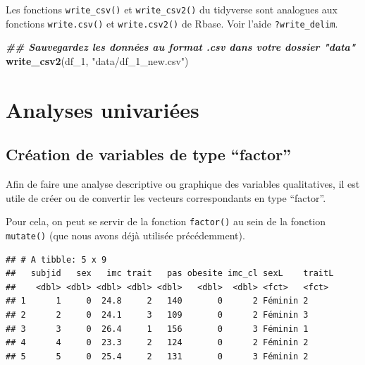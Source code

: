 \documentclass[
]{book}
\newenvironment{Shaded}{\begin{snugshade}}{\end{snugshade}}
\newcommand{\AttributeTok}[1]{\textcolor[rgb]{0.13,0.29,0.53}{#1}}
\newcommand{\CommentTok}[1]{\textcolor[rgb]{0.56,0.35,0.01}{\textit{#1}}}
\newcommand{\DecValTok}[1]{\textcolor[rgb]{0.00,0.00,0.81}{#1}}
\newcommand{\DocumentationTok}[1]{\textcolor[rgb]{0.56,0.35,0.01}{\textbf{\textit{#1}}}}
\newcommand{\FunctionTok}[1]{\textcolor[rgb]{0.13,0.29,0.53}{\textbf{#1}}}
\newcommand{\NormalTok}[1]{#1}
\newcommand{\OtherTok}[1]{\textcolor[rgb]{0.56,0.35,0.01}{#1}}
\newcommand{\SpecialCharTok}[1]{\textcolor[rgb]{0.81,0.36,0.00}{\textbf{#1}}}
\newcommand{\StringTok}[1]{\textcolor[rgb]{0.31,0.60,0.02}{#1}}
\begin{document}
Les fonctions \texttt{write\_csv()} et \texttt{write\_csv2()} du tidyverse sont analogues aux fonctions \texttt{write.csv()} et \texttt{write.csv2()} de Rbase. Voir l'aide \texttt{?write\_delim}.

\begin{Shaded}
\begin{Highlighting}[]
\DocumentationTok{\#\# Sauvegardez les données au format .csv dans votre dossier "data"}
\FunctionTok{write\_csv2}\NormalTok{(df\_1, }\StringTok{"data/df\_1\_new.csv"}\NormalTok{) }
\end{Highlighting}
\end{Shaded}

\section{Analyses univariées}\label{analyses-univariuxe9es-2}

\subsection{Création de variables de type ``factor''}\label{cruxe9ation-de-variables-de-type-factor}

Afin de faire une analyse descriptive ou graphique des variables qualitatives, il est utile de créer ou de convertir les vecteurs correspondants en type ``factor''.

Pour cela, on peut se servir de la fonction \texttt{factor()} au sein de la fonction \texttt{mutate()} (que nous avons déjà utilisée précédemment).

\begin{Shaded}
\end{Shaded}

\begin{verbatim}
## # A tibble: 5 x 9
##   subjid   sex   imc trait   pas obesite imc_cl sexL    traitL
##    <dbl> <dbl> <dbl> <dbl> <dbl>   <dbl>  <dbl> <fct>   <fct> 
## 1      1     0  24.8     2   140       0      2 Féminin 2     
## 2      2     0  24.1     3   109       0      2 Féminin 3     
## 3      3     0  26.4     1   156       0      3 Féminin 1     
## 4      4     0  23.3     2   124       0      2 Féminin 2     
## 5      5     0  25.4     2   131       0      3 Féminin 2
\end{verbatim}
\end{document}
